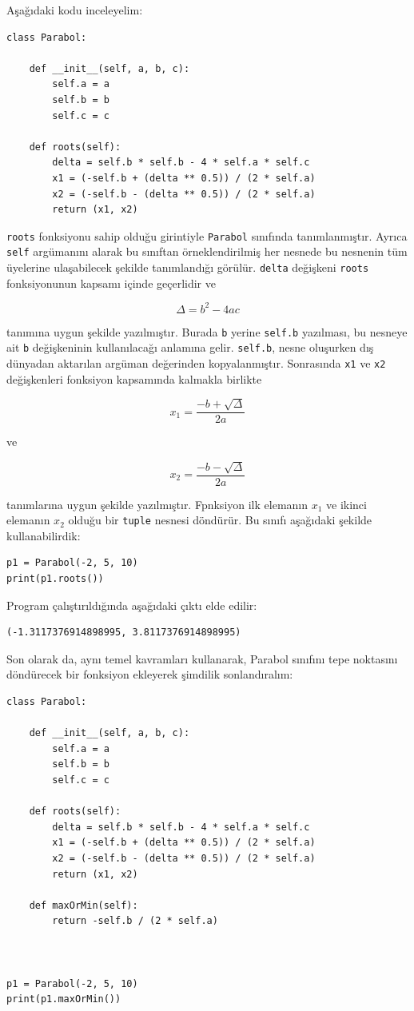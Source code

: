 \documentclass[12pt]{report}
\begin{document}
Aşağıdaki kodu inceleyelim:


\begin{Verbatim}[frame = single]
class Parabol:

	def __init__(self, a, b, c):
		self.a = a
		self.b = b
		self.c = c

	def roots(self):
		delta = self.b * self.b - 4 * self.a * self.c
		x1 = (-self.b + (delta ** 0.5)) / (2 * self.a)
		x2 = (-self.b - (delta ** 0.5)) / (2 * self.a)
		return (x1, x2)
\end{Verbatim}

\texttt{roots} fonksiyonu sahip olduğu girintiyle \texttt{Parabol} sınıfında tanımlanmıştır. Ayrıca \texttt{self} argümanını alarak bu sınıftan örneklendirilmiş her nesnede bu nesnenin tüm üyelerine ulaşabilecek şekilde tanımlandığı görülür. \texttt{delta} değişkeni \texttt{roots} fonksiyonunun kapsamı içinde geçerlidir ve 

$$
\Delta = b^2 - 4ac
$$

tanımına uygun şekilde yazılmıştır. Burada \texttt{b} yerine \texttt{self.b} yazılması, bu nesneye ait \texttt{b} değişkeninin kullanılacağı anlamına gelir. \texttt{self.b}, nesne oluşurken dış dünyadan aktarılan argüman değerinden kopyalanmıştır. Sonrasında \texttt{x1} ve \texttt{x2} değişkenleri fonksiyon kapsamında kalmakla birlikte

$$
x_1 = \frac{-b + \sqrt{\Delta}}{2a}
$$

ve 

$$
x_2 = \frac{-b - \sqrt{\Delta}}{2a}
$$

tanımlarına uygun şekilde yazılmıştır. Fpnksiyon ilk elemanın $x_1$ ve ikinci elemanın $x_2$ olduğu bir \texttt{tuple} nesnesi döndürür. Bu sınıfı aşağıdaki şekilde kullanabilirdik:


\begin{Verbatim}[frame = single]
p1 = Parabol(-2, 5, 10)
print(p1.roots())
\end{Verbatim}


Program çalıştırıldığında aşağıdaki çıktı elde edilir:


\begin{Verbatim}[frame = single]
(-1.3117376914898995, 3.8117376914898995)
\end{Verbatim}


Son olarak da, aynı temel kavramları kullanarak, Parabol sınıfını tepe noktasını döndürecek bir fonksiyon ekleyerek şimdilik sonlandıralım:


\begin{Verbatim}[frame = single]
class Parabol:

	def __init__(self, a, b, c):
		self.a = a
		self.b = b
		self.c = c
	
	def roots(self):
		delta = self.b * self.b - 4 * self.a * self.c
		x1 = (-self.b + (delta ** 0.5)) / (2 * self.a)
		x2 = (-self.b - (delta ** 0.5)) / (2 * self.a)
		return (x1, x2)
	
	def maxOrMin(self):
		return -self.b / (2 * self.a)



p1 = Parabol(-2, 5, 10)
print(p1.maxOrMin())
\end{Verbatim}
\end{document}
